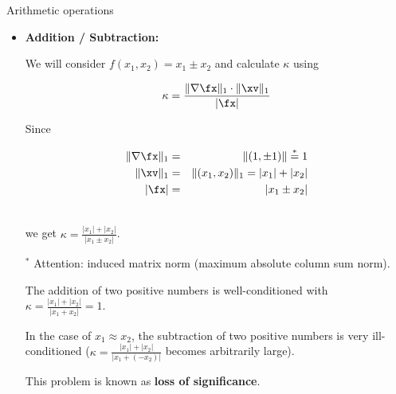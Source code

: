 \documentclass[11pt,compress,t,notes=noshow, xcolor=table]{beamer}
\begin{document}
\begin{vbframe}{Arithmetic operations}
\begin{itemize}
\item \textbf{Addition / Subtraction: }

We will consider $f(x_1, x_2) = x_1 \pm x_2$ and calculate $\kappa$ using

$$
\kappa = \frac{\|\nabla \fx\|_1 \cdot \|\xv\|_1}{|\fx|}
$$

Since

\vspace*{-.5cm}

\begin{eqnarray*}
\|\nabla \fx\|_1 &=& \|(1, \pm 1) \|\overset{*}{=} 1 \\\
\|\xv\|_1 &=& \|(x_1, x_2)\|_1 = |x_1| + |x_2| \\\
|\fx| &=& |x_1 \pm x_2|\\\
\end{eqnarray*}

\vspace*{-.5cm}

we get $\kappa = \frac{|x_1| + |x_2|}{|x_1 \pm x_2|}$.

\lz

\begin{footnotesize}
$^*$ Attention: induced matrix norm (maximum absolute column sum norm).
\end{footnotesize}

\framebreak

The addition of two positive numbers is well-conditioned with $\kappa = \frac{|x_1| + |x_2|}{|x_1 + x_2|} = 1$.

\lz

In the case of $x_1 \approx x_2$, the subtraction of two positive numbers is very ill-conditioned  ($\kappa = \frac{|x_1| + |x_2|}{|x_1 + (- x_2)|}$ becomes arbitrarily large).
\lz

This problem is known as \textbf{loss of significance}.

\end{itemize}

\end{vbframe}
\end{document}
